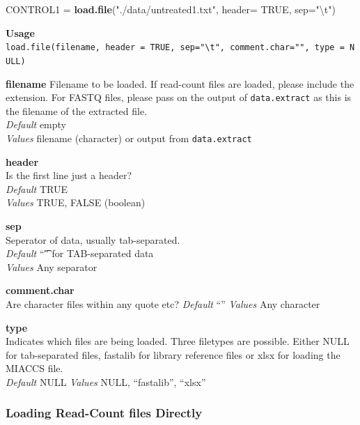 \documentclass[]{article}
\newenvironment{Shaded}{\begin{snugshade}}{\end{snugshade}}
\newcommand{\KeywordTok}[1]{\textcolor[rgb]{0.13,0.29,0.53}{\textbf{{#1}}}}
\newcommand{\DataTypeTok}[1]{\textcolor[rgb]{0.13,0.29,0.53}{{#1}}}
\newcommand{\CharTok}[1]{\textcolor[rgb]{0.31,0.60,0.02}{{#1}}}
\newcommand{\StringTok}[1]{\textcolor[rgb]{0.31,0.60,0.02}{{#1}}}
\newcommand{\OtherTok}[1]{\textcolor[rgb]{0.56,0.35,0.01}{{#1}}}
\newcommand{\NormalTok}[1]{{#1}}
\begin{document}
\begin{Shaded}
\begin{Highlighting}[]
\NormalTok{CONTROL1 =}\StringTok{ }\KeywordTok{load.file}\NormalTok{(}\StringTok{"./data/untreated1.txt"}\NormalTok{, }\DataTypeTok{header=} \OtherTok{TRUE}\NormalTok{, }\DataTypeTok{sep=}\StringTok{"}\CharTok{\textbackslash{}t}\StringTok{"}\NormalTok{)}
\end{Highlighting}
\end{Shaded}

\textbf{Usage}\\
\texttt{load.file(filename,\ header\ =\ TRUE,\ sep="\textbackslash{}t",\ comment.char="",\ type\ =\ NULL)}

\textbf{filename} Filename to be loaded. If read-count files are loaded,
please include the extension. For FASTQ files, please pass on the output
of \texttt{data.extract} as this is the filename of the extracted
file.\\
\emph{Default} empty\\
\emph{Values} filename (character) or output from \texttt{data.extract}

\textbf{header}\\
Is the first line just a header?\\
\emph{Default} TRUE\\
\emph{Values} TRUE, FALSE (boolean)

\textbf{sep}\\
Seperator of data, usually tab-separated.\\
\emph{Default} ``\t'' for TAB-separated data\\
\emph{Values} Any separator

\textbf{comment.char}\\
Are character files within any quote etc? \emph{Default} ``''
\emph{Values} Any character

\textbf{type}\\
Indicates which files are being loaded. Three filetypes are possible.
Either NULL for tab-separated files, fastalib for library reference
files or xlsx for loading the MIACCS file.\\
\emph{Default} NULL \emph{Values} NULL, ``fastalib'', ``xlsx''

\subsubsection{Loading Read-Count files
Directly}\label{loading-read-count-files-directly}
\end{document}
